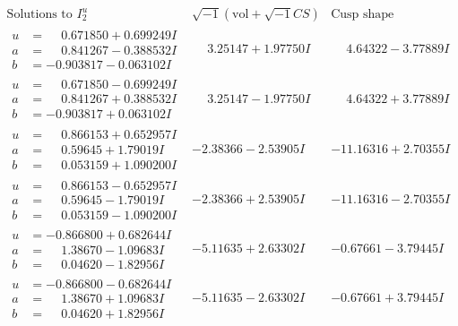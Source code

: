 \documentclass[1p]{elsarticle_modified}
\theoremstyle{definition}
\newcommand{\I}{\sqrt{-1}}
\begin{document}
$$\begin{array}{c|c|c}  
\text{Solutions to }I^u_{2}& \I (\text{vol} + \sqrt{-1}CS) & \text{Cusp shape}\\
 \hline 
\begin{aligned}
u &= \phantom{-}0.671850 + 0.699249 I \\
a &= \phantom{-}0.841267 - 0.388532 I \\
b &= -0.903817 - 0.063102 I\end{aligned}
 & \phantom{-}3.25147 + 1.97750 I & \phantom{-}4.64322 - 3.77889 I \\ \hline\begin{aligned}
u &= \phantom{-}0.671850 - 0.699249 I \\
a &= \phantom{-}0.841267 + 0.388532 I \\
b &= -0.903817 + 0.063102 I\end{aligned}
 & \phantom{-}3.25147 - 1.97750 I & \phantom{-}4.64322 + 3.77889 I \\ \hline\begin{aligned}
u &= \phantom{-}0.866153 + 0.652957 I \\
a &= \phantom{-}0.59645 + 1.79019 I \\
b &= \phantom{-}0.053159 + 1.090200 I\end{aligned}
 & -2.38366 - 2.53905 I & -11.16316 + 2.70355 I \\ \hline\begin{aligned}
u &= \phantom{-}0.866153 - 0.652957 I \\
a &= \phantom{-}0.59645 - 1.79019 I \\
b &= \phantom{-}0.053159 - 1.090200 I\end{aligned}
 & -2.38366 + 2.53905 I & -11.16316 - 2.70355 I \\ \hline\begin{aligned}
u &= -0.866800 + 0.682644 I \\
a &= \phantom{-}1.38670 - 1.09683 I \\
b &= \phantom{-}0.04620 - 1.82956 I\end{aligned}
 & -5.11635 + 2.63302 I & -0.67661 - 3.79445 I \\ \hline\begin{aligned}
u &= -0.866800 - 0.682644 I \\
a &= \phantom{-}1.38670 + 1.09683 I \\
b &= \phantom{-}0.04620 + 1.82956 I\end{aligned}
 & -5.11635 - 2.63302 I & -0.67661 + 3.79445 I \\ \hline\begin{aligned}

\end{aligned}
\end{array}$$
\end{document}

